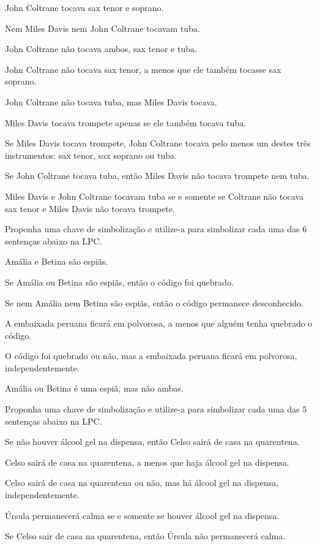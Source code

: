 \begin{earg}
	\item John Coltrane tocava sax tenor e soprano.
	\item Nem Miles Davis nem John Coltrane tocavam tuba.
	\item John Coltrane não tocava ambos, sax tenor e tuba.
	\item John Coltrane não tocava sax tenor, a menos que ele também tocasse sax soprano.
	\item John Coltrane não tocava tuba, mas Miles Davis tocava.
	\item Miles Davis tocava trompete apenas se ele também tocava tuba.
	\item Se Miles Davis tocava trompete, John Coltrane tocava pelo menos um destes três instrumentos: sax tenor, sax soprano ou tuba.
	\item Se John Coltrane tocava tuba, então  Miles Davis não tocava trompete nem tuba.
	\item Miles Davis e John Coltrane tocavam tuba se e somente se Coltrane não tocava sax tenor e Miles Davis não tocava trompete.
\end{earg}

\solutions
\problempart
\label{pr.spies}
Proponha uma chave de simbolização e utilize-a para simbolizar  cada uma das 6 sentenças abaixo na LPC.
\begin{earg}
	\item Amália e Betina são espiãs.
	\item Se Amália ou Betina são espiãs, então o código foi quebrado.
	\item Se nem Amália nem Betina são espiãs, então o código permanece desconhecido.
	\item A embaixada peruana ficará em polvorosa, a menos que alguém tenha quebrado o código.
	\item O código foi quebrado ou não, mas a embaixada peruana ficará em polvorosa, independentemente.
	\item Amália ou Betina é uma espiã, mas não ambas.
\end{earg}

\solutions
\problempart Proponha uma chave de simbolização e utilize-a para simbolizar  cada uma das 5 sentenças abaixo na LPC.
\begin{earg}
	\item Se não houver álcool gel na dispensa, então Celso sairá de casa na quarentena.
	\item Celso sairá de casa na quarentena, a menos que haja álcool gel na dispensa.
	\item Celso sairá de casa na quarentena ou não, mas há álcool gel na dispensa, independentemente.
	\item Úrsula permanecerá calma se e somente se houver álcool gel na dispensa.
	\item Se Celso sair de casa na quarentena, então Úrsula não permanecerá calma.
\end{earg}

